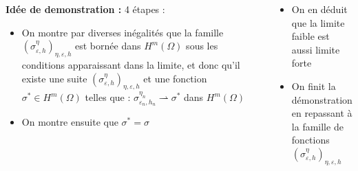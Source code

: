 \documentclass[final]{beamer}
\newlength{\sepwid}
\newlength{\onecolwid}
\newlength{\twocolwid}
\begin{document}
\begin{frame}[t]
\begin{columns}[t]
\begin{column}{\onecolwid}
\begin{block}{}
\textbf{Idée de demonstration :} 4 étapes :
\begin{itemize}
	\item On montre par diverses inégalités que la famille $(\sigma^\eta_{\varepsilon, h})_{\eta,\varepsilon, h}$ est bornée dans $H^m(\Omega)$ sous les conditions apparaissant dans la limite, et donc qu'il existe une suite $(\sigma^\eta_{\varepsilon, h})_{\eta,\varepsilon, h}$ et une fonction $\sigma^*\in H^m(\Omega)$ telles que : $\sigma^{\eta_n}_{\varepsilon_n, h_n}\rightharpoonup \sigma^*$ dans $H^m(\Omega)$
	\item On montre ensuite que $\sigma^*=\sigma$
\end{itemize}
\end{block}

\end{column} %

\begin{column}{\sepwid}\end{column} %

\begin{column}{\twocolwid} %
\begin{columns}[t,totalwidth=\twocolwid] %

\begin{column}{\onecolwid}\vspace{-.6in} %
\begin{itemize}
	\item On en déduit que la limite faible est aussi limite forte
	\item On finit la démonstration en repassant à la famille de fonctions $(\sigma^\eta_{\varepsilon, h})_{\eta,\varepsilon, h}$
\end{itemize}


\end{column}
\end{columns}
\end{column}
\end{columns}
\end{frame}
\end{document}
